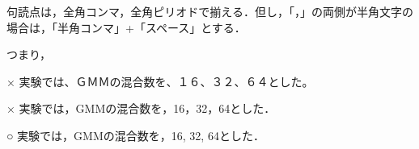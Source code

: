 句読点は，全角コンマ，全角ピリオドで揃える．但し，「，」の両側が半角文字の場合は，「半角コンマ」+「スペース」とする．

つまり，

×  実験では、ＧＭＭの混合数を、１６、３２、６４とした。

×  実験では，GMMの混合数を，16，32，64とした．

○  実験では，GMMの混合数を，16, 32, 64とした．